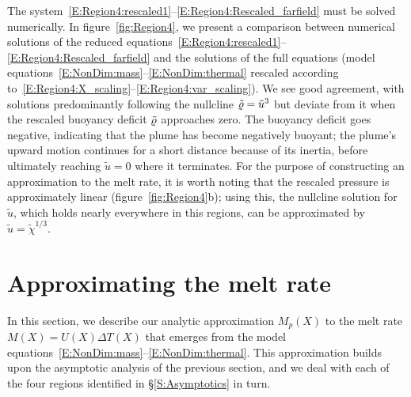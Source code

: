 \documentclass[openacc]{rsproca_new}%
\begin{document}
The system~\eqref{E:Region4:rescaled1}--\eqref{E:Region4:Rescaled_farfield} must be solved numerically. In figure~\ref{fig:Region4}, we present a comparison between numerical solutions of the reduced equations~\eqref{E:Region4:rescaled1}--\eqref{E:Region4:Rescaled_farfield} and the solutions of the full equations (model equations~\eqref{E:NonDim:mass}--\eqref{E:NonDim:thermal} rescaled according to~\eqref{E:Region4:X_scaling}--\eqref{E:Region4:var_scaling}). We see good agreement, with solutions predominantly following the nullcline $\tilde{\varrho} = \tilde{u}^3$ but deviate from it when the rescaled buoyancy deficit $\tilde{\varrho}$ approaches zero. The buoyancy deficit goes negative, indicating that the plume has become negatively buoyant; the plume's upward motion continues for a short distance because of its inertia, before ultimately reaching $\tilde{u} = 0$ where it terminates. For the purpose of constructing an approximation to the melt rate, it is worth noting that the rescaled pressure is approximately linear (figure~\ref{fig:Region4}b); using this, the nullcline solution for $\tilde{u}$, which holds nearly everywhere in this regions, can be approximated by $\tilde{u} = \tilde{\chi}^{1/3}$.




\section{Approximating the melt rate}\label{S:MeltRate}
In this section, we describe our analytic approximation $M_p(X)$ to the melt rate $M(X) = U(X)\Delta T(X)$ that emerges from the model equations~\eqref{E:NonDim:mass}--\eqref{E:NonDim:thermal}. This approximation builds upon the asymptotic analysis of the previous section, and we deal with each of the four regions identified in \S\ref{S:Asymptotics} in turn.
\end{document}
